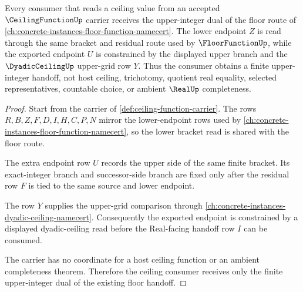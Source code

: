 \begin{theorem}
\label{thm:ceiling-function-floor-dual-handoff}
Every consumer that reads a ceiling value from an accepted $\CeilingFunctionUp$ carrier receives the upper-integer dual of the floor route of \autoref{ch:concrete-instances-floor-function-namecert}. The lower endpoint $Z$ is read through the same bracket and residual route used by $\FloorFunctionUp$, while the exported endpoint $U$ is constrained by the displayed upper branch and the $\DyadicCeilingUp$ upper-grid row $Y$. Thus the consumer obtains a finite upper-integer handoff, not host ceiling, trichotomy, quotient real equality, selected representatives, countable choice, or ambient $\RealUp$ completeness.
\end{theorem}
\begin{proof}
Start from the carrier of \autoref{def:ceiling-function-carrier}. The rows $R,B,Z,F,D,I,H,C,P,N$ mirror the lower-endpoint rows used by \autoref{ch:concrete-instances-floor-function-namecert}, so the lower bracket read is shared with the floor route.

The extra endpoint row $U$ records the upper side of the same finite bracket. Its exact-integer branch and successor-side branch are fixed only after the residual row $F$ is tied to the same source and lower endpoint.

The row $Y$ supplies the upper-grid comparison through \autoref{ch:concrete-instances-dyadic-ceiling-namecert}. Consequently the exported endpoint is constrained by a displayed dyadic-ceiling read before the Real-facing handoff row $I$ can be consumed.

The carrier has no coordinate for a host ceiling function or an ambient completeness theorem. Therefore the ceiling consumer receives only the finite upper-integer dual of the existing floor handoff.
\end{proof}

